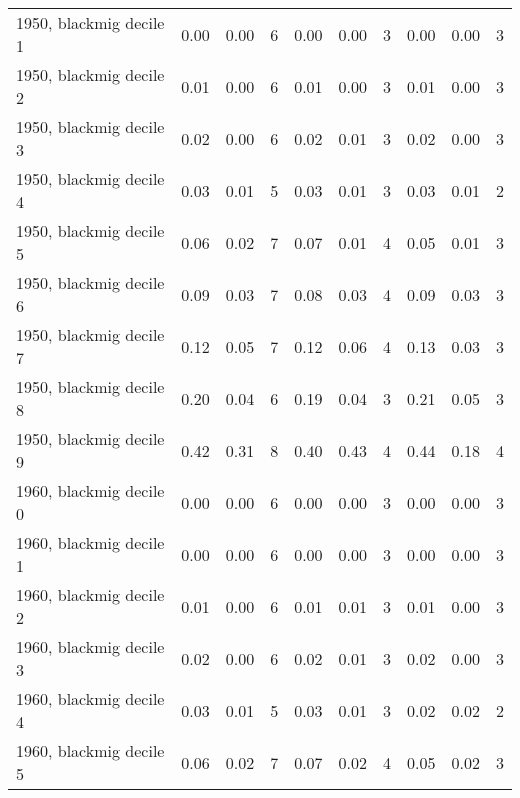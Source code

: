 \begin{table}[htbp]
\begin{tabular}{l*{3}{ccc}}
1950, blackmig decile 1&        0.00&        0.00&           6&        0.00&        0.00&           3&        0.00&        0.00&           3\\
1950, blackmig decile 2&        0.01&        0.00&           6&        0.01&        0.00&           3&        0.01&        0.00&           3\\
1950, blackmig decile 3&        0.02&        0.00&           6&        0.02&        0.01&           3&        0.02&        0.00&           3\\
1950, blackmig decile 4&        0.03&        0.01&           5&        0.03&        0.01&           3&        0.03&        0.01&           2\\
1950, blackmig decile 5&        0.06&        0.02&           7&        0.07&        0.01&           4&        0.05&        0.01&           3\\
1950, blackmig decile 6&        0.09&        0.03&           7&        0.08&        0.03&           4&        0.09&        0.03&           3\\
1950, blackmig decile 7&        0.12&        0.05&           7&        0.12&        0.06&           4&        0.13&        0.03&           3\\
1950, blackmig decile 8&        0.20&        0.04&           6&        0.19&        0.04&           3&        0.21&        0.05&           3\\
1950, blackmig decile 9&        0.42&        0.31&           8&        0.40&        0.43&           4&        0.44&        0.18&           4\\
1960, blackmig decile 0&        0.00&        0.00&           6&        0.00&        0.00&           3&        0.00&        0.00&           3\\
1960, blackmig decile 1&        0.00&        0.00&           6&        0.00&        0.00&           3&        0.00&        0.00&           3\\
1960, blackmig decile 2&        0.01&        0.00&           6&        0.01&        0.01&           3&        0.01&        0.00&           3\\
1960, blackmig decile 3&        0.02&        0.00&           6&        0.02&        0.01&           3&        0.02&        0.00&           3\\
1960, blackmig decile 4&        0.03&        0.01&           5&        0.03&        0.01&           3&        0.02&        0.02&           2\\
1960, blackmig decile 5&        0.06&        0.02&           7&        0.07&        0.02&           4&        0.05&        0.02&           3\\

\end{tabular}
\end{table}
